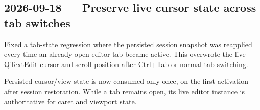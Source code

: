 \documentclass[a4paper]{article}
\begin{document}
   \begin{preview}
      \section*{2026-09-18 --- Preserve live cursor state across tab switches}

      Fixed a tab-state regression where the persisted session snapshot was
      reapplied every time an already-open editor tab became active. This
      overwrote the live QTextEdit cursor and scroll position after Ctrl+Tab or
      normal tab switching.

      Persisted cursor/view state is now consumed only once, on the first
      activation after session restoration. While a tab remains open, its live
      editor instance is authoritative for caret and viewport state.
   \end{preview}
\end{document}
